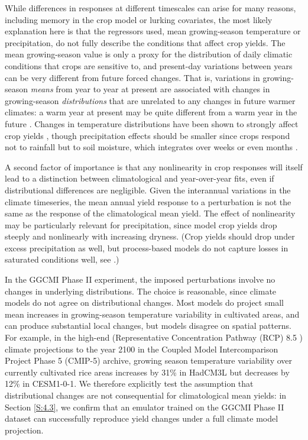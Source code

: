 \documentclass[gmd, manuscript]{copernicus} %
\begin{document}
While differences in responses at different timescales can arise for many reasons, including memory in the crop model or lurking covariates, the most likely explanation here is that the regressors used, mean growing-season temperature or precipitation, do not fully describe the conditions that affect crop yields. 
The mean growing-season value is only a proxy for the distribution of daily climatic conditions that crops are sensitive to, and present-day variations between years can be very different from future forced changes. 
That is, variations in growing-season \textit{means} from year to year at present are associated with changes in growing-season \textit{distributions} that are unrelated to any changes in future warmer climates: a warm year at present may be quite different from a warm year in the future \citep[e.g.][]{Ruane2016}. %
Changes in temperature distributions have been shown to strongly affect crop yields \citep[e.g.][]{Hansen2000, Gadgil2002}, though precipitation effects should be smaller since crops respond not to rainfall but to soil moisture, which integrates over weeks or even months \citep[e.g.][]{potter2005effects, Glotter14, CHALLINOR200499}. 

A second factor of importance is that any nonlinearity in crop responses will itself lead to a distinction between climatological and year-over-year fits, even if distributional differences are negligible. 
Given the interannual variations in the climate timeseries, the mean annual yield response to a perturbation is not the same as the response of the climatological mean yield. 
The effect of nonlinearity may be particularly relevant for precipitation, since model crop yields drop steeply and nonlinearly with increasing dryness. 
(Crop yields should drop under excess precipitation as well, but process-based models do not capture losses in saturated conditions well, see \citet{Glotter15,Li2019}.) 

In the GGCMI Phase II experiment, the imposed perturbations involve no changes in underlying distributions.
The choice is reasonable, since climate models do not agree on distributional changes.
Most models do project small mean increases in growing-season temperature variability in cultivated areas, and can produce substantial local changes, but models disagree on spatial patterns.
For example, in the high-end (Representative Concentration Pathway (RCP) 8.5 \citep{riahi2011rcp}) climate projections to the year 2100 in the Coupled Model Intercomparison Project Phase 5 (CMIP-5) archive, growing season temperature variability over currently cultivated rice areas increases by 31\% in HadCM3L but decreases by 12\% in CESM1-0-1. 
We therefore explicitly test the assumption that distributional changes are not consequential for climatological mean yields: in Section \ref{S:4.3}, we confirm that an emulator trained on the GGCMI Phase II dataset can successfully reproduce yield changes under a full climate model projection.
\end{document}
